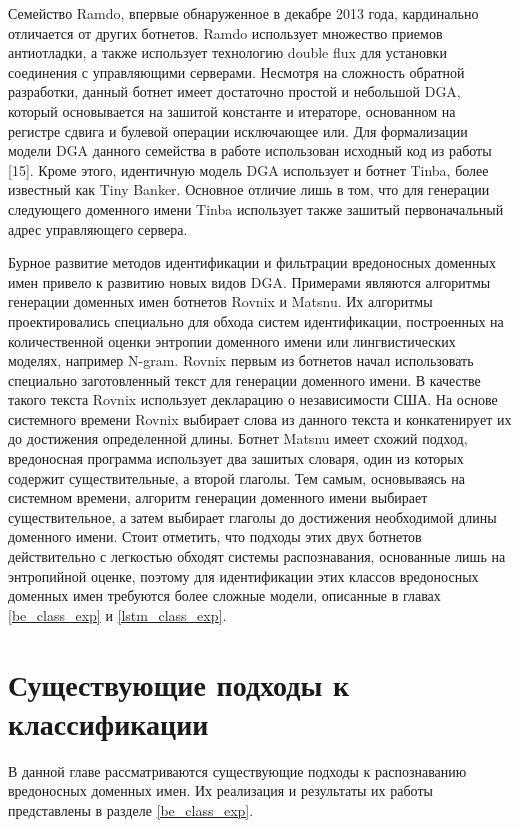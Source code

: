 Семейство Ramdo, впервые обнаруженное в декабре 2013 года, кардинально отличается от других ботнетов. Ramdo использует множество приемов антиотладки, а также использует технологию double flux для установки соединения с управляющими серверами. Несмотря на сложность обратной разработки, данный ботнет имеет достаточно простой и небольшой DGA, который основывается на зашитой константе и итераторе, основанном на регистре сдвига и булевой операции исключающее или. Для формализации модели DGA данного семейства в работе использован исходный код из работы [15]. Кроме этого, идентичную модель DGA использует и ботнет Tinba, более известный как Tiny Banker. Основное отличие лишь в том, что для генерации следующего доменного имени Tinba использует также зашитый первоначальный адрес управляющего сервера.

Бурное развитие методов идентификации и фильтрации вредоносных доменных имен привело к развитию новых видов DGA. Примерами являются алгоритмы генерации доменных имен ботнетов Rovnix и Matsnu. Их алгоритмы проектировались специально для обхода систем идентификации, построенных на количественной оценки энтропии доменного имени или лингвистических моделях, например N-gram. Rovnix первым из ботнетов начал использовать специально заготовленный текст для генерации доменного имени. В качестве такого текста Rovnix использует декларацию о независимости США. На основе системного времени Rovnix выбирает слова из данного текста и конкатенирует их до достижения определенной длины. Ботнет Matsnu имеет схожий подход, вредоносная программа использует два зашитых словаря, один из которых содержит существительные, а второй глаголы. Тем самым, основываясь на системном времени, алгоритм генерации доменного имени выбирает существительное, а затем выбирает глаголы до достижения необходимой длины доменного имени. Стоит отметить, что подходы этих двух ботнетов действительно с легкостью обходят системы распознавания, основанные лишь на энтропийной оценке, поэтому для идентификации этих классов вредоносных доменных имен требуются более сложные модели, описанные в главах \ref{be_class_exp} и \ref{lstm_class_exp}.
\clearpage

\section{Существующие подходы к классификации}\label{be_class}
В данной главе рассматриваются существующие подходы к распознаванию вредоносных доменных имен. Их реализация и результаты их работы представлены в разделе \ref{be_class_exp}.

